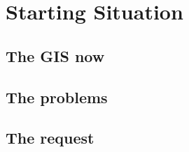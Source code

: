
\section{Starting Situation}


\subsection{The GIS now} %


\subsection{The problems} %

\subsection{The request} %